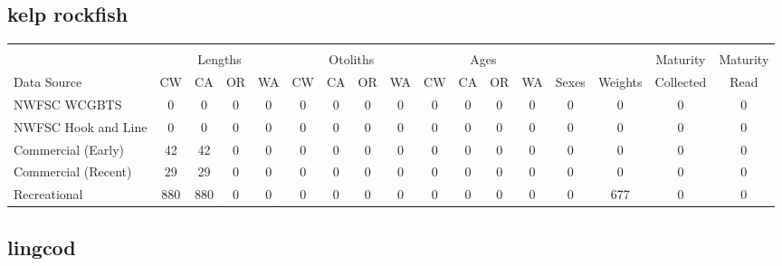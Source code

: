 \documentclass[12pt,]{article}
\begin{document}
\FloatBarrier  

\subsection{kelp rockfish}\label{kelp-rockfish}

\begin{table}[ht]
\centering
\begingroup\fontsize{10pt}{10pt}\selectfont
\begin{tabular}{|l|cccc|cccc|cccc|c|c|c|c|}
  \hline
 &  &  &  &  &  &  &  &  &  &  &  &  &  &  &  &  \\ 
   & \multicolumn{4}{c}{Lengths} &  \multicolumn{4}{c}{Otoliths} & \multicolumn{4}{c}{Ages} &  & & Maturity & Maturity\\
 Data Source & CW & CA & OR & WA & CW & CA & OR & WA & CW & CA & OR & WA & Sexes & Weights & Collected & Read\\
 \hline
NWFSC WCGBTS & 0 & 0 & 0 & 0 & 0 & 0 & 0 & 0 & 0 & 0 & 0 & 0 & 0 & 0 & 0 & 0 \\ 
  NWFSC Hook and Line & 0 & 0 & 0 & 0 & 0 & 0 & 0 & 0 & 0 & 0 & 0 & 0 & 0 & 0 & 0 & 0 \\ 
  Commercial (Early) & 42 & 42 & 0 & 0 & 0 & 0 & 0 & 0 & 0 & 0 & 0 & 0 & 0 & 0 & 0 & 0 \\ 
  Commercial (Recent) & 29 & 29 & 0 & 0 & 0 & 0 & 0 & 0 & 0 & 0 & 0 & 0 & 0 & 0 & 0 & 0 \\ 
  Recreational & 880 & 880 & 0 & 0 & 0 & 0 & 0 & 0 & 0 & 0 & 0 & 0 & 0 & 677 & 0 & 0 \\ 
   \hline
\end{tabular}
\endgroup
\end{table}

\FloatBarrier  

\subsection{lingcod}\label{lingcod}
\end{document}

